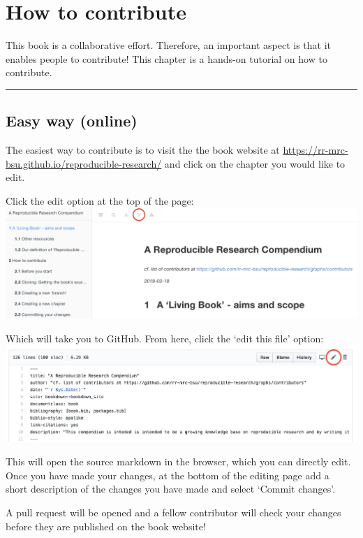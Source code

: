 \documentclass[]{book}
\begin{document}
\chapter{How to contribute}\label{chptr-how-to-contribute}

This book is a collaborative effort. Therefore, an important aspect is
that it enables people to contribute! This chapter is a hands-on
tutorial on how to contribute.

\begin{center}\rule{0.5\linewidth}{\linethickness}\end{center}

\section{Easy way (online)}\label{easy-way-online}

The easiest way to contribute is to visit the the book website at
\url{https://rr-mrc-bsu.github.io/reproducible-research/} and click on
the chapter you would like to edit.

Click the edit option at the top of the page:
\includegraphics{Figures/alternative1.png}

Which will take you to GitHub. From here, click the `edit this file'
option: \includegraphics{Figures/alternative2.png}

This will open the source markdown in the browser, which you can
directly edit. Once you have made your changes, at the bottom of the
editing page add a\\
short description of the changes you have made and select `Commit
changes'.

A pull request will be opened and a fellow contributor will check your
changes\\
before they are published on the book website!
\end{document}
